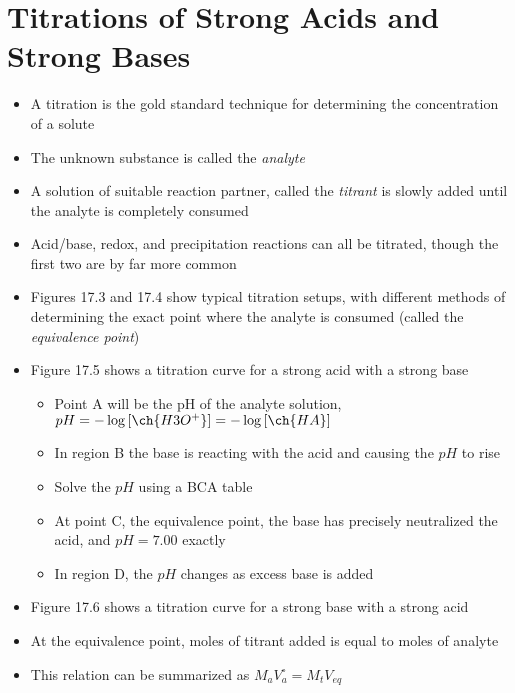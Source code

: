 \documentclass[12pt, openany, letterpaper]{memoir}
\begin{document}
\section{Titrations of Strong Acids and Strong Bases}
\begin{itemize}
	\item A titration is the gold standard technique for determining the concentration of a solute
	\item The unknown substance is called the \emph{analyte}
	\item A solution of suitable reaction partner, called the \emph{titrant} is slowly added until the analyte is completely consumed
	\item Acid/base, redox, and precipitation reactions can all be titrated, though the first two are by far more common
	\item Figures 17.3 and 17.4 show typical titration setups, with different methods of determining the exact point where the analyte is consumed (called the \emph{equivalence point})
	\item Figure 17.5 shows a titration curve for a strong acid with a strong base
	\begin{itemize}
		\item Point A will be the pH of the analyte solution, $pH=-\log\left[\ch{H3O^+}\right]=-\log\left[\ch{HA}\right]$
		\item In region B the base is reacting with the acid and causing the $pH$ to rise
		\item Solve the $pH$ using a BCA table
		\item At point C, the equivalence point, the base has precisely neutralized the acid, and $pH=7.00$ exactly
		\item In region D, the $pH$ changes as excess base is added
	\end{itemize}
	\item Figure 17.6 shows a titration curve for a strong base with a strong acid
	\item At the equivalence point, moles of titrant added is equal to moles of analyte
	\item This relation can be summarized as $M_aV^\circ_a=M_tV_{eq}$
\end{itemize}
\end{document}
